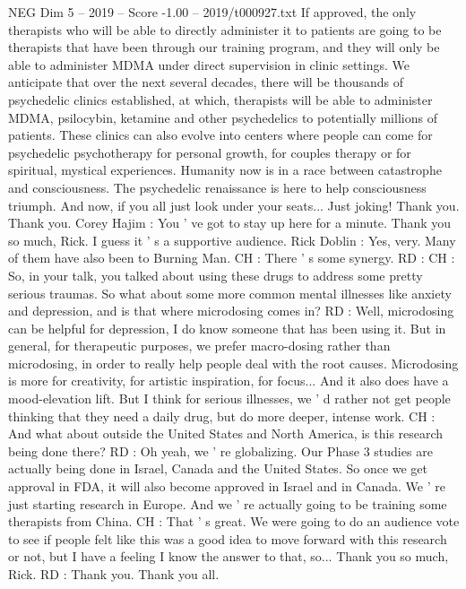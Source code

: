 \begin{textsample}{NEG Dim 5 – 2019 – Score -1.00 – 2019/t000927.txt}
If approved, the only therapists who will be able to directly administer it to patients are going to be therapists that have been through our training program, and they will only be able to administer MDMA under direct supervision in clinic settings.
We anticipate that over the next several decades, there will be thousands of psychedelic clinics established, at which, therapists will be able to administer MDMA, psilocybin, ketamine and other psychedelics to potentially millions of patients.
These clinics can also evolve into centers where people can come for psychedelic psychotherapy for personal growth, for couples therapy or for spiritual, mystical experiences.
Humanity now is in a race between catastrophe and consciousness.
The psychedelic renaissance is here to help consciousness triumph.
And now, if you all just look under your seats...
Just joking!
Thank you.
Thank you.
Corey Hajim : You ' ve got to stay up here for a minute.
Thank you so much, Rick.
I guess it ' s a supportive audience.
Rick Doblin : Yes, very.
Many of them have also been to Burning Man.
CH : There ' s some synergy.
RD : CH : So, in your talk, you talked about using these drugs to address some pretty serious traumas.
So what about some more common mental illnesses like anxiety and depression, and is that where microdosing comes in?
RD : Well, microdosing can be helpful for depression, I do know someone that has been using it.
But in general, for therapeutic purposes, we prefer macro-dosing rather than microdosing, in order to really help people deal with the root causes.
Microdosing is more for creativity, for artistic inspiration, for focus...
And it also does have a mood-elevation lift.
But I think for serious illnesses, we ' d rather not get people thinking that they need a daily drug, but do more deeper, intense work.
CH : And what about outside the United States and North America, is this research being done there?
RD : Oh yeah, we ' re globalizing.
Our Phase 3 studies are actually being done in Israel, Canada and the United States.
So once we get approval in FDA, it will also become approved in Israel and in Canada.
We ' re just starting research in Europe.
And we ' re actually going to be training some therapists from China.
CH : That ' s great.
We were going to do an audience vote to see if people felt like this was a good idea to move forward with this research or not, but I have a feeling I know the answer to that, so...
Thank you so much, Rick.
RD : Thank you.
Thank you all.

\end{textsample}
